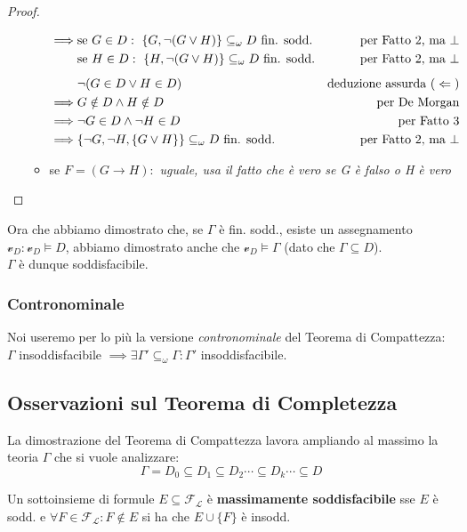 \begin{proof}
\begin{itemize}
\begin{itemize}
\begin{align*}
            \implies & \text{se } G \in D:\ \{G, \neg (G \lor H)\} \subseteq_{\omega} D \text{ fin. sodd.} & \text{per Fatto 2, ma }\bot \\
            & \text{se } H \in D:\  \{H, \neg (G \lor H)\} \subseteq_{\omega} D \text{ fin. sodd.} & \text{per Fatto 2, ma } \bot \\[5pt]
            & \neg(G \in D \lor H \in D) & \text{deduzione assurda (} \Leftarrow \text )\\
            \implies & G \notin D \land H \notin D & \text{per De Morgan}\\
            \implies & \neg G \in D \land \neg H \in D & \text{per Fatto 3}\\
            \implies & \{\neg G, \neg H, \{G \lor H \}\} \subseteq_{\omega} D \text{ fin. sodd. }& \text{per Fatto 2, ma } \bot
          \end{align*}
       \item se $F = (G \rightarrow H): $ \textit{uguale, usa il fatto che è vero se G è falso o H è vero }
    \end{itemize}
\end{itemize}
\end{proof}

Ora che abbiamo dimostrato che, se $\Gamma$ è fin. sodd., esiste un assegnamento $\mathcal v_D : \mathcal v_D \models D$, abbiamo dimostrato anche che $\mathcal v_D \models \Gamma$ (dato che $\Gamma \subseteq D$).\\
$\Gamma$ è dunque soddisfacibile.

\subsubsection{Contronominale}
Noi useremo per lo più la versione \textit{contronominale} del Teorema di Compattezza:\\
$\Gamma$ insoddisfacibile $\implies \exists \Gamma' \subseteq_{\omega} \Gamma : \Gamma'$ insoddisfacibile. 

\subsection{Osservazioni sul Teorema di Completezza}
La dimostrazione del Teorema di Compattezza lavora ampliando al massimo la teoria $\Gamma$ che si vuole analizzare:
$$
\Gamma = D_0 \subseteq D_1 \subseteq D_2 \cdots \subseteq D_k \cdots \subseteq D
$$

\begin{defi}
  Un sottoinsieme di formule $E \subseteq \mathscr{F_L}$ è \textbf{massimamente soddisfacibile} sse 
$E$ è sodd. e $\forall F \in \mathscr{F_L} : F\notin E$ si ha che $E \cup \{F\}$ è insodd. 
\end{defi}

